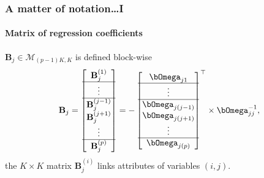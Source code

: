 \begin{frame}
  \frametitle{A matter of notation\dots I}
  \framesubtitle{Matrix of regression coefficients}
  
 $\mathbf{B}_j\in\mathcal{M}_{(p-1)K,K}$ is defined block-wise
  \begin{equation*}
  \mathbf{B}_j = \begin{bmatrix}
    \mathbf{B}_j^{(1)} \\ \hline
    \vdots \\ \hline
    \mathbf{B}_j^{(j-1)} \\ 
    \mathbf{B}_j^{(j+1)} \\ 
    \vdots \\ \hline
    \mathbf{B}_j^{(p)} \\ 
  \end{bmatrix} = - \begin{bmatrix}
    \invcov_{j1} \\ \hline
    \vdots \\ \hline
    \invcov_{j(j-1)} \\ 
    \invcov_{j(j+1)} \\ 
    \vdots \\ \hline
    \invcov_{j(p)} \\ 
  \end{bmatrix}^\top \times \invcov_{jj}^{-1},
\end{equation*}
 \rsa the $K\times K$  matrix  $\mathbf{B}_j^{(i)}$ links attributes of variables $(i,j)$.

\end{frame}

